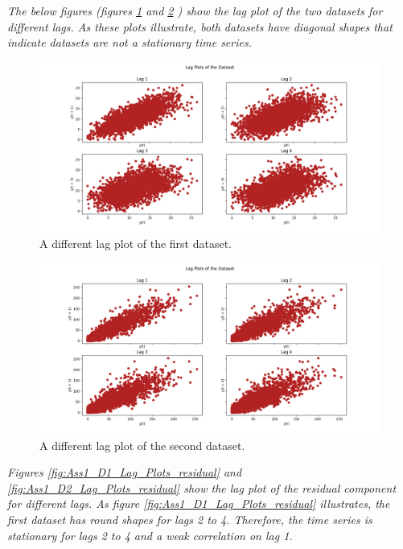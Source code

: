 \textit{The below figures (figures \ref{fig:Ass1_D1_Lag_Plots} and \ref{fig:Ass1_D2_Lag_Plots} ) show the lag plot of the two datasets for different lags. As these plots illustrate, both datasets have diagonal shapes that indicate datasets are not a stationary time series.  }


\begin{figure}[H]
    \centering
    \begin{minipage}[b]{1\textwidth}
        \includegraphics[width=\textwidth]{figures/Ass1/Ass1_D1_Lag_Plots.png}
    \end{minipage}
    \caption{A different lag plot of the first dataset.}
    \label{fig:Ass1_D1_Lag_Plots}
\end{figure}

\begin{figure}[H]
    \centering
    \begin{minipage}[b]{1\textwidth}
        \includegraphics[width=\textwidth]{figures/Ass1/Ass1_D2_Lag_Plots.png}
    \end{minipage}
    \caption{A different lag plot of the second dataset.}
    \label{fig:Ass1_D2_Lag_Plots}
\end{figure}


\textit{Figures \ref{fig:Ass1_D1_Lag_Plots_residual} and \ref{fig:Ass1_D2_Lag_Plots_residual} show the lag plot of the residual component for different lags. As figure \ref{fig:Ass1_D1_Lag_Plots_residual} illustrates, the first dataset has round shapes for lags 2 to 4. Therefore, the time series is stationary for lags 2 to 4 and a weak correlation on lag 1.}

